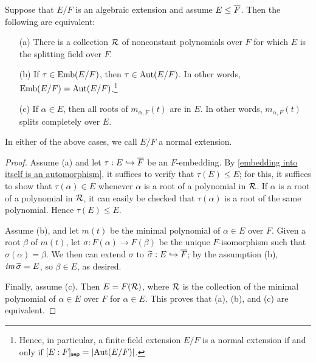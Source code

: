 \begin{thm}\label{equiv_normal_extensions}
    Suppose that $E/F$ is an algebraic extension and assume $E\leq\overline{F}$.
    Then the following are equivalent:
    \begin{enumerate}
        \item[(a)]
        {
            There is a collection ${\mathcal{R}}$ of nonconstant polynomials over $F$ for which $E$ is the splitting field over $F$.
        }
        \item[(b)]
        {
            If $\tau\in{\textrm{Emb}({E/F})}$, then $\tau\in{\textrm{Aut}({E/F})}$.
            In other words, ${\textrm{Emb}({E/F})}={\textrm{Aut}({E/F})}$.\footnote{Hence, in particular, a finite field extension $E/F$ is a normal extension if and only if $[E:F]_{\textsf{sep}}=|{\textrm{Aut}({E/F})}|$.}
        }
        \item[(c)]
        {
            If $\alpha\in E$, then all roots of $m_{\alpha, F}(t)$ are in $E$.
            In other words, $m_{\alpha, F}(t)$ splits completely over $E$.
        }
    \end{enumerate}
    In either of the above cases, we call $E/F$ a normal extension.
\end{thm}
\begin{proof}
    Assume (a) and let $\tau: E\hookrightarrow\overline{F}$ be an $F$-embedding.
    By \cref{embedding into itself is an automorphism}, it suffices to verify that $\tau(E)\leq E$; for this, it suffices to show that $\tau(\alpha)\in E$ whenever $\alpha$ is a root of a polynomial in ${\mathcal{R}}$.
    If $\alpha$ is a root of a polynomial in ${\mathcal{R}}$, it can easily be checked that $\tau(\alpha)$ is a root of the same polynomial.
    Hence $\tau(E)\leq E$.

    Assume (b), and let $m(t)$ be the minimal polynomial of $\alpha\in E$ over $F$.
    Given a root $\beta$ of $m(t)$, let $\sigma: F(\alpha)\rightarrow F(\beta)$ be the unique $F$-isomorphism such that $\sigma(\alpha)=\beta$.
    We then can extend $\sigma$ to $\widetilde{\sigma}: E\hookrightarrow\overline{F}$; by the assumption (b), $\textit{im\,}\widetilde{\sigma}=E$, so $\beta\in E$, as desired.

    Finally, assume (c).
    Then $E=F({\mathcal{R}})$, where ${\mathcal{R}}$ is the collection of the minimal polynomial of $\alpha\in E$ over $F$ for $\alpha\in E$.
    This proves that (a), (b), and (c) are equivalent.
\end{proof}


